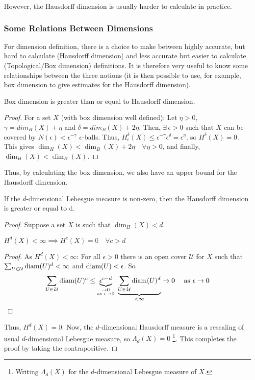 However, the Hausdorff dimension is usually harder to calculate in practice.

\subsubsection{Some Relations Between Dimensions}
For dimension definition, there is a choice to make between highly accurate, but hard to calculate (Hausdorff dimension) and less accurate but easier to calculate (Topological/Box dimension) definitions.
It is therefore very useful to know some relationships between the three notions (it is then possible to use, for example, box dimension to give estimates for the Hausdorff dimension).

\begin{property}
	Box dimension is greater than or equal to Hausdorff dimension.
\end{property}
\begin{proof}
	For a set $X$ (with box dimension well defined):
	Let $\eta > 0$, $\gamma = dim_B(X) + \eta$ and $\delta = dim_B(X) + 2\eta$.
	Then, $\exists \, \epsilon > 0$ such that $X$ can be covered by $N(\epsilon) < \epsilon^{-\gamma}$ $\epsilon$-balls.
	Thus, $H_{\epsilon}^{\delta}(X) \leq \epsilon^{-\gamma}\epsilon^{\delta} = \epsilon^{\eta}$, so $H^{\delta}(X) = 0$.
	This gives $\dim_H(X) < \dim_B(X) + 2\eta \quad \forall \eta > 0$, and finally, $\dim_H(X) < \dim_B(X)$.
\end{proof}

Thus, by calculating the box dimension, we also have an upper bound for the Hausdorff dimension.

\begin{lemma}
	If the $d$-dimensional Lebesgue measure is non-zero, then the Hausdorff dimension is greater or equal to d.
\end{lemma}
\begin{proof}
	Suppose a set $X$ is such that $\dim_H(X)<d$.
	\begin{claim}
		$H^d(X) < \infty \implies H^c(X) = 0 \quad \forall c > d$
	\end{claim}
	\begin{proof}
		As $H^d(X) < \infty$: For all $\epsilon > 0$ there is an open cover $\mathcal{U}$ for $X$ such that $\sum_{U \in \mathcal{U}} \text{diam}(U)^d < \infty$ and $\text{diam}(U) < \epsilon$.
		So
		$$\sum_{U \in \, \mathcal{U}} \diam{U}^c \leq
		\underbrace{\epsilon^{c-d}}_{\substack{\to 0\\\text{as } \epsilon \to 0}} \ 
		\underbrace{\sum_{U \in \, \mathcal{U}} \diam{U}^d}_{< \infty}
		\to 0 \quad \text{ as } \epsilon \to 0
		$$
	\end{proof}
	Thus, $H^d(X) = 0$.
	Now, the $d$-dimensional Hausdorff measure is a rescaling of usual $d$-dimensional Lebesgue measure, so $\Lambda_d(X) = 0$ \footnote{Writing $\Lambda_d(X)$ for the $d$-dimensional Lebesgue measure of $X$.}.
	This completes the proof by taking the contrapositive.
\end{proof}

